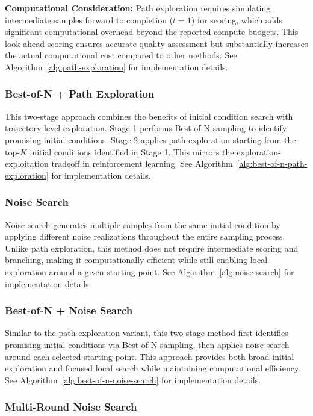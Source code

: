 \documentclass{article}
\begin{document}
\textbf{Computational Consideration:} Path exploration requires simulating intermediate samples forward to completion ($t=1$) for scoring, which adds significant computational overhead beyond the reported compute budgets. This look-ahead scoring ensures accurate quality assessment but substantially increases the actual computational cost compared to other methods. See Algorithm~\ref{alg:path-exploration} for implementation details.

\subsubsection{Best-of-N + Path Exploration}

This two-stage approach combines the benefits of initial condition search with trajectory-level exploration. Stage 1 performs Best-of-N sampling to identify promising initial conditions. Stage 2 applies path exploration starting from the top-$K$ initial conditions identified in Stage 1. This mirrors the exploration-exploitation tradeoff in reinforcement learning. See Algorithm~\ref{alg:best-of-n-path-exploration} for implementation details.

\subsubsection{Noise Search}

Noise search generates multiple samples from the same initial condition by applying different noise realizations throughout the entire sampling process. Unlike path exploration, this method does not require intermediate scoring and branching, making it computationally efficient while still enabling local exploration around a given starting point. See Algorithm~\ref{alg:noise-search} for implementation details.

\subsubsection{Best-of-N + Noise Search}

Similar to the path exploration variant, this two-stage method first identifies promising initial conditions via Best-of-N sampling, then applies noise search around each selected starting point. This approach provides both broad initial exploration and focused local search while maintaining computational efficiency. See Algorithm~\ref{alg:best-of-n-noise-search} for implementation details.

\subsubsection{Multi-Round Noise Search}
\end{document}
